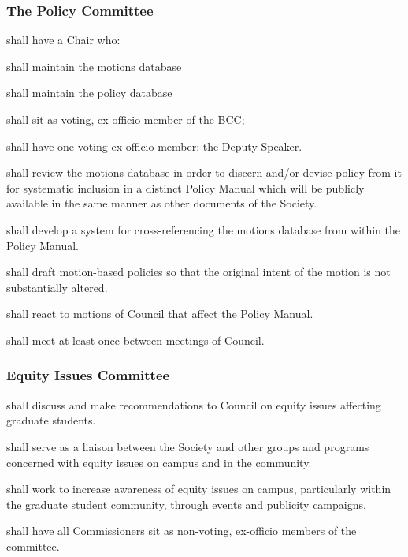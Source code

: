 \subsubsection{The Policy Committee}
\begin{longenum}[ label*=\thesubsubsection.\arabic*., align=left]
	\item shall have a Chair who:
    \begin{longenum}[ label*=\arabic*., align=left]
		\item shall maintain the motions database
        \item shall maintain the policy database
        \item shall sit as voting, ex-officio member of the BCC;
	\end{longenum}
    \item shall have one voting ex-officio member: the Deputy 
Speaker.
	\item shall review the motions database in order to discern and/or devise policy from it for systematic inclusion in a distinct Policy Manual which will be  publicly available in the same manner as other documents of the Society.
    \item shall develop a system for cross-referencing the motions database from within the Policy Manual.
    \item shall draft motion-based policies so that the original intent of the motion is not substantially altered.
    \item shall react to motions of Council that affect the Policy Manual.
    \item shall meet at least once between meetings of Council.
    
\end{longenum}

\subsubsection{Equity Issues Committee} 
\begin{longenum}[ label*=\thesubsubsection.\arabic*., align=left]
	\item shall discuss and make recommendations to Council on equity issues affecting graduate students.
    \item shall serve as a liaison between the Society and other groups and programs concerned with equity issues on campus and in the community.
    \item shall work to increase awareness of equity issues on campus, particularly within the graduate student community, through events and publicity campaigns.
    \item shall have all Commissioners sit as non-voting, ex-officio members of the committee.
\end{longenum}

